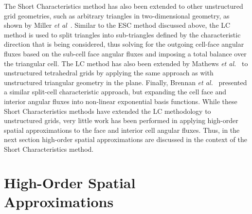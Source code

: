 The Short Characteristics method has also been extended to other unstructured grid geometries, such as arbitrary triangles in two-dimensional geometry, as shown by Miller \textit{et al}~\cite{Miller1996}.
Similar to the \ac{ESC} method discussed above, the \ac{LC} method is used to split triangles into sub-triangles defined by the characteristic direction that is being considered, thus solving for the outgoing cell-face angular fluxes based on the sub-cell face angular fluxes and imposing a total balance over the triangular cell.
The \ac{LC} method has also been extended by Mathews \textit{et al.}~\cite{Mathews2000} to unstructured tetrahedral grids by applying the same approach as with unstructured triangular geometry in the plane.
Finally, Brennan \textit{et al.}~\cite{Brennan2001} presented a similar split-cell characteristic approach, but expanding the cell face and interior angular fluxes into non-linear exponential basis functions.
While these Short Characteristics methods have extended the \ac{LC} methodology to unstructured grids, very little work has been performed in applying high-order spatial approximations to the face and interior cell angular fluxes.
Thus, in the next section high-order spatial approximations are discussed in the context of the Short Characteristics method.


\section{High-Order Spatial Approximations}


